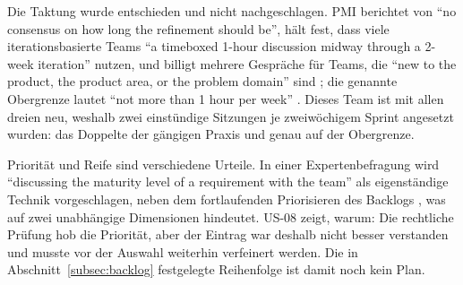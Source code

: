 Die Taktung wurde entschieden und nicht nachgeschlagen. PMI berichtet von
\enquote{no consensus on how
long the refinement should be}, hält fest, dass viele iterationsbasierte Teams
\enquote{a timeboxed 1-hour discussion midway through a 2-week iteration} nutzen,
und billigt mehrere Gespräche für Teams, die \enquote{new to the product, the product
area, or the problem domain} sind \parencite[p.~52]{pmi2017}; die genannte
Obergrenze lautet \enquote{not more than 1 hour per week} \parencite[p.~53]{pmi2017}. Dieses Team
ist mit allen dreien neu, weshalb zwei einstündige Sitzungen je zweiwöchigem
Sprint angesetzt wurden: das Doppelte der gängigen Praxis und genau auf der
Obergrenze.

Priorität und Reife sind verschiedene Urteile. In einer Expertenbefragung wird
\enquote{discussing the maturity level of a requirement with the team} als
eigenständige Technik vorgeschlagen, neben dem fortlaufenden Priorisieren des
Backlogs \parencite[p.~46]{schoen2017}, was auf zwei unabhängige Dimensionen
hindeutet. US-08 zeigt, warum: Die rechtliche Prüfung hob die Priorität, aber
der Eintrag war deshalb nicht besser verstanden und musste vor der Auswahl
weiterhin verfeinert werden. Die in Abschnitt~\ref{subsec:backlog} festgelegte
Reihenfolge ist damit noch kein Plan.



